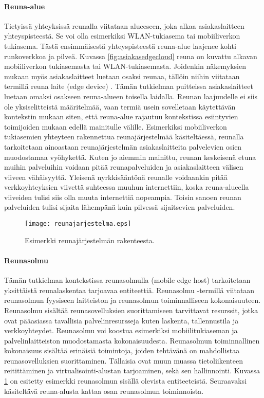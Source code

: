 \paragraph{Reuna-alue} 
Tietyissä yhteyksissä reunalla viitataan alueeseen, joka alkaa asiakaslaitteen yhteyspisteestä. Se voi olla esimerkiksi WLAN-tukiasema tai mobiiliverkon tukiasema. Tästä ensimmäisestä yhteyspisteestä reuna-alue laajenee kohti runkoverkkoa ja pilveä.
Kuvassa \ref{fig:asiakasedgecloud} reuna on kuvattu alkavan mobiiliverkon tukiasemasta tai WLAN-tukiasemasta.
Joidenkin näkemyksien mukaan myös asiakaslaitteet luetaan osaksi reunaa, tällöin niihin viitataan termillä reuna laite (edge device) \cite{garcia}.
Tämän tutkielman puitteissa asiakaslaitteet luetaan omaksi osakseen reuna-alueen toisella laidalla.
Reunan laajuudelle ei siis ole yksiselitteistä määritelmää, vaan termiä usein sovelletaan käytettävän kontekstin mukaan siten, että reuna-alue rajautuu kontekstissa esiintyvien toimijoiden mukaan edellä mainitulle välille.
Esimerkiksi mobiiliverkon tukiasemien yhteyteen rakennettua reunajärjestelmää käsiteltäessä, reunalla tarkoitetaan ainoastaan reunajärjestelmän asiakaslaitteita palvelevien osien muodostamaa vyöhykettä. 
Kuten jo aiemmin mainittu, reunan keskeisenä etuna muihin palveluihin voidaan pitää reunapalveluiden ja asiakaslaitteen välisen viiveen vähäisyyttä.
Yleisenä nyrkkisääntönä reunalle voidaankin pitää verkkoyhteyksien viivettä suhteessa muuhun internettiin, koska reuna-alueella viiveiden tulisi siis olla muuta internettiä nopeampia. Toisin sanoen reunan palveluiden tulisi sijaita lähempänä kuin pilvessä sijaitsevien palveluiden.

\begin{figure}[tb]
\texttt{[image: reunajarjestelma.eps]}
\caption{Esimerkki reunajärjestelmän rakenteesta.} \label{fig:reunajarjestelma}
\end{figure}


\paragraph{Reunasolmu} 
Tämän tutkielman kontekstissa reunasolmulla (mobile edge host) tarkoitetaan yksittäistä reunalaskentaa tarjoavaa entiteettiä\cite{etsirefarch}.
Reunasolmu -termillä viitataan reunasolmun fyysiseen laitteiston ja reunasolmun toiminnalliseen kokonaisuuteen.
Reunasolmu sisältää reunasovelluksien suorittamiseen tarvittavat resurssit, jotka ovat pääasiassa tavallisia palvelinresursseja kuten laskenta, tallennustila ja verkkoyhteydet.
Reunasolmu voi koostua esimerkiksi mobiilitukiaseman ja palvelinlaitteiston muodostamasta kokonaisuudesta. 
Reunasolmun toiminnallinen kokonaisuus sisältää erinäisiä toimintoja, joiden tehtävänä on mahdollistaa reunasovelluksien suorittaminen.
Tällaisia ovat muun muassa tietoliikenteen reitittäminen ja virtualisointi-alustan tarjoaminen, sekä sen hallinnointi.
Kuvassa \ref{fig:reunajarjestelma} on esitetty esimerkki reunasolmun sisällä olevista entiteeteistä. 
Seuraavaksi käsiteltävä reuna-alusta kattaa osan reunasolmun toiminnoista.

